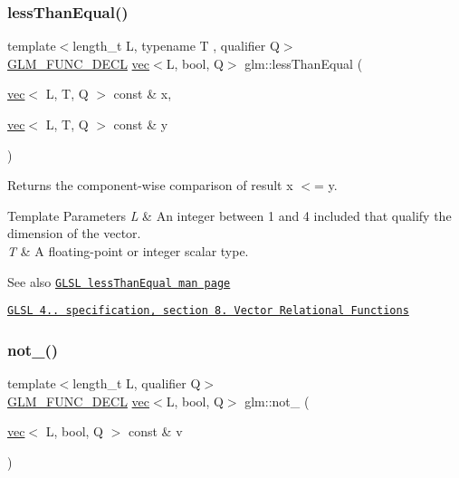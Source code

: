 \subsubsection{\texorpdfstring{less\+Than\+Equal()}{lessThanEqual()}}
{\footnotesize\ttfamily template$<$length\+\_\+t L, typename T , qualifier Q$>$ \\
\mbox{\hyperlink{setup_8hpp_ab2d052de21a70539923e9bcbf6e83a51}{G\+L\+M\+\_\+\+F\+U\+N\+C\+\_\+\+D\+E\+CL}} \mbox{\hyperlink{structglm_1_1vec}{vec}}$<$L, bool, Q$>$ glm\+::less\+Than\+Equal (\begin{DoxyParamCaption}\item[{\mbox{\hyperlink{structglm_1_1vec}{vec}}$<$ L, T, Q $>$ const \&}]{x,  }\item[{\mbox{\hyperlink{structglm_1_1vec}{vec}}$<$ L, T, Q $>$ const \&}]{y }\end{DoxyParamCaption})}

Returns the component-\/wise comparison of result x $<$= y.


\begin{DoxyTemplParams}{Template Parameters}
{\em L} & An integer between 1 and 4 included that qualify the dimension of the vector. \\
\hline
{\em T} & A floating-\/point or integer scalar type.\\
\hline
\end{DoxyTemplParams}
\begin{DoxySeeAlso}{See also}
\href{http://www.opengl.org/sdk/docs/manglsl/xhtml/lessThanEqual.xml}{\tt G\+L\+SL less\+Than\+Equal man page} 

\href{http://www.opengl.org/registry/doc/GLSLangSpec.4.20.8.pdf}{\tt G\+L\+SL 4.. specification, section 8. Vector Relational Functions} 
\end{DoxySeeAlso}
\mbox{\label{group__core__func__vector__relational_ga464f1392c934f69a917ab8bb6eda5b09}} 
\subsubsection{\texorpdfstring{not\+\_\+()}{not\_()}}
{\footnotesize\ttfamily template$<$length\+\_\+t L, qualifier Q$>$ \\
\mbox{\hyperlink{setup_8hpp_ab2d052de21a70539923e9bcbf6e83a51}{G\+L\+M\+\_\+\+F\+U\+N\+C\+\_\+\+D\+E\+CL}} \mbox{\hyperlink{structglm_1_1vec}{vec}}$<$L, bool, Q$>$ glm\+::not\+\_\+ (\begin{DoxyParamCaption}\item[{\mbox{\hyperlink{structglm_1_1vec}{vec}}$<$ L, bool, Q $>$ const \&}]{v }\end{DoxyParamCaption})}

